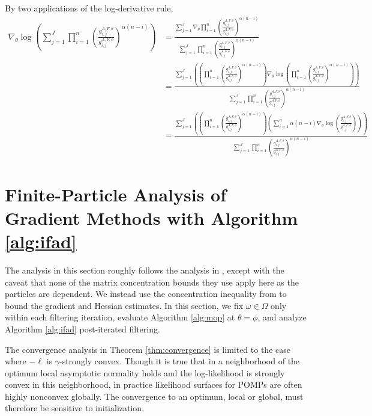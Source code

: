 \documentclass{article}
\begin{document}
By two applications of the log-derivative rule,
\begin{align*}
    \nabla_\theta \log\left(\sum_{j=1}^J\prod_{i=1}^n\left(\frac{g_{i,j}^{A,F,\theta}}{g_{i,j}^{A,F,\phi}} \right)^{\alpha(n-i)}\right)
    &= \frac{\sum_{j=1}^J\nabla_\theta \prod_{i=1}^n\left(\frac{g_{i,j}^{A,F,\theta}}{g_{i,j}^{A,F,\phi}} \right)^{\alpha(n-i)}}{\sum_{j=1}^J\prod_{i=1}^n\left(\frac{g_{i,j}^{A,F,\theta}}{g_{i,j}^{A,F,\phi}} \right)^{\alpha(n-i)}} \\
    &= \frac{\sum_{j=1}^J \left(\left(\prod_{i=1}^n\left(\frac{g_{i,j}^{A,F,\theta}}{g_{i,j}^{A,F,\phi}} \right)^{\alpha(n-i)}\right) \nabla_\theta \log\left(\prod_{i=1}^n \left(\frac{g_{i,j}^{A,F,\theta}}{g_{i,j}^{A,F,\phi}} \right)^{\alpha(n-i)}\right)\right)}{\sum_{j=1}^J\prod_{i=1}^n\left(\frac{g_{i,j}^{A,F,\theta}}{g_{i,j}^{A,F,\phi}} \right)^{\alpha(n-i)}} \\
    &= \frac{\sum_{j=1}^J \left(\left(\prod_{i=1}^n\left(\frac{g_{i,j}^{A,F,\theta}}{g_{i,j}^{A,F,\phi}} \right)^{\alpha(n-i)} \right)\left(\sum_{i=1}^n \alpha(n-i)\nabla_\theta \log\left(\frac{g_{i,j}^{A,F,\theta}}{g_{i,j}^{A,F,\phi}} \right)\right)\right)}{\sum_{j=1}^J\prod_{i=1}^n\left(\frac{g_{i,j}^{A,F,\theta}}{g_{i,j}^{A,F,\phi}} \right)^{\alpha(n-i)}} 
\end{align*}


\section{Finite-Particle Analysis of Gradient Methods with Algorithm \ref{alg:ifad}}
\label{app:ifad}

The analysis in this section roughly follows the analysis in \cite{mahoney16}, except with the caveat that none of the matrix concentration bounds they use apply here as the particles are dependent. We instead use the concentration inequality from \cite{delmoral2011ci} to bound the gradient and Hessian estimates. In this section, we fix $\omega \in \Omega$ only within each filtering iteration, evaluate Algorithm \ref{alg:mop} at $\theta=\phi$, and analyze Algorithm \ref{alg:ifad} post-iterated filtering.


The convergence analysis in Theorem \ref{thm:convergence} is limited to the case where $-\ell$ is $\gamma$-strongly convex. Though it is true that in a neighborhood of the optimum local asymptotic normality holds and the log-likelihood is strongly convex in this neighborhood, in practice likelihood surfaces for POMPs are often highly nonconvex globally. The convergence to an optimum, local or global, must therefore be sensitive to initialization.  
\end{document}
